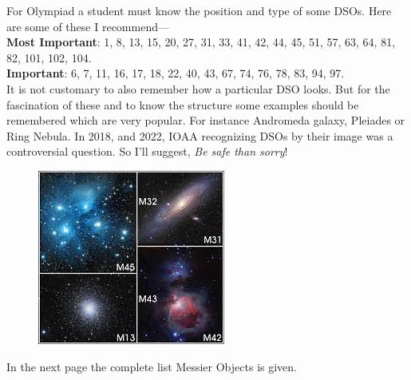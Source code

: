 \documentclass[a4paper,12pt]{extarticle}
\begin{document}
For Olympiad a student must know the position and type of some DSOs. Here are some of these I recommend---\\

\textbf{Most Important}: {\color{red} 1, 8, 13, 15, 20, 27, 31, 33, 41, 42, 44, 45, 51, 57, 63, 64, 81, 82, 101, 102, 104.}\\

\textbf{Important}: 6, 7, 11, 16, 17, 18, 22, 40, 43, 67, 74, 76, 78, 83, 94, 97.\\

It is not customary to also remember how a particular DSO looks. But for the fascination of these and to know the structure some examples should be remembered which are very popular. For instance Andromeda galaxy, Pleiades or Ring Nebula. In 2018,  and 2022,  IOAA recognizing DSOs by their image was a controversial question. So I'll suggest, \textit{Be safe than sorry}!  

\begin{figure}[H]
    \centering
    \includegraphics[width=0.5\linewidth]{m_o.jpg}
\end{figure}

In the next page the complete list Messier Objects is given. 
\end{document}
